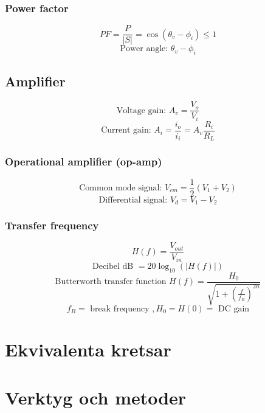 \documentclass{article}
\begin{document}
\subsubsection{Power factor}
\[ PF = \frac{P}{|S|} = \cos(\theta_v - \phi_i) \leq 1 \]
\[ \textrm{Power angle: } \theta_v - \phi_i \]

\subsection{Amplifier}
\[ \textrm{Voltage gain: } A_v = \frac{V_o}{V_i} \]
\[ \textrm{Current gain: } A_i = \frac{i_o}{i_i} = A_v \frac{R_i}{R_L} \]

\subsubsection{Operational amplifier (op-amp)}
\[ \textrm{Common mode signal: } V_{cm} = \frac{1}{2}(V_1 + V_2) \]
\[ \textrm{Differential signal: } V_d = V_1 - V_2 \]

\subsubsection{Transfer frequency}
\[ H(f) = \frac{V_{out}}{V_{in}} \]
\[ \textrm{Decibel dB } = 20 \log_{10}(|H(f)|) \]
\[ \textrm{Butterworth transfer function } H(f) = \frac{H_0}{\sqrt{1 + \left( \frac{f}{f_B} \right)^{2n}}} \]
\[ f_B = \textrm{ break frequency }, H_0 = H(0) = \textrm{ DC gain} \]


\section{Ekvivalenta kretsar}


\section{Verktyg och metoder}

\end{document}
